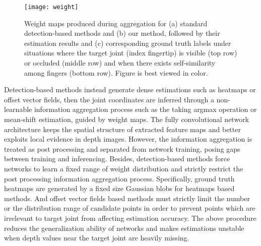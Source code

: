 \documentclass[letterpaper]{article} \usepackage{aaai20}  \usepackage{times}  \usepackage{helvet} \usepackage{courier}  \usepackage[hyphens]{url}  \usepackage{graphicx} \usepackage{amsmath}
\begin{document}
\parskip=0pt

\begin{figure}[t]
\centering
\texttt{[image: weight]} 
\caption{Weight maps produced during aggregation for (a) standard detection-based methods and (b) our method, followed by their estimation results and (c) corresponding ground truth labels under situations where the target joint (index fingertip) is visible (top row) or occluded (middle row) and when there exists self-similarity among fingers (bottom row). Figure is best viewed in color.}
\end{figure}

\parskip=0pt

Detection-based methods instead generate dense estimations such as heatmaps\cite{point2pose,simple} or offset vector fields\cite{dense3d,srn}, then the joint coordinates are inferred through a non-learnable information aggregation process such as the taking argmax operation or mean-shift estimation, guided by weight maps. The fully convolutional network architecture keeps the spatial structure of extracted feature maps and better exploits local evidence in depth images. However, the information aggregation is treated as post processing and separated from network training, posing gaps between training and inferencing. Besides, detection-based methods force networks to learn a fixed range of weight distribution and strictly restrict the post processing information aggregation process. Specifically, ground truth heatmaps are generated by a fixed size Gaussian blobs for heatmaps based methods. And offset vector fields based methods must strictly limit the number \cite{dense3d} or the distribution range of candidate points \cite{p2p} in order to prevent points which are irrelevant to target joint from affecting estimation accuracy. The above procedure reduces the generalization ability of networks and makes estimations unstable when depth values near the target joint are heavily missing.

\parskip=0pt
\end{document}
